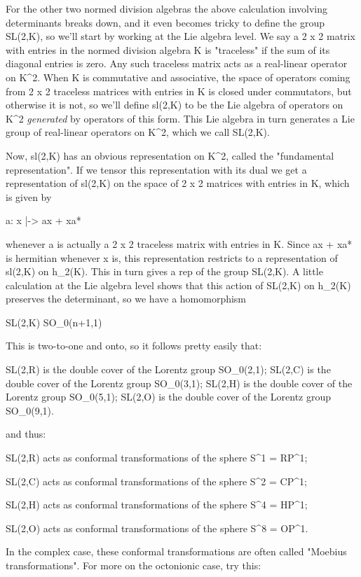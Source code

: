 For the other two normed division algebras the above calculation
involving determinants breaks down, and it even becomes tricky to define
the group SL(2,K), so we'll start by working at the Lie algebra level.
We say a 2 x 2 matrix with entries in the normed division algebra K is
"traceless" if the sum of its diagonal entries is zero.  Any
such traceless matrix acts as a real-linear operator on K^{2}.
When K is commutative and associative, the space of operators coming
from 2 x 2 traceless matrices with entries in K is closed under
commutators, but otherwise it is not, so we'll define sl(2,K) to be the
Lie algebra of operators on K^{2} \emph{generated} by
operators of this form.  This Lie algebra in turn generates a Lie group
of real-linear operators on K^{2}, which we call SL(2,K).

Now, sl(2,K) has an obvious representation on K^{2}, called the
"fundamental representation".  If we tensor this
representation with its dual we get a representation of sl(2,K) on the
space of 2 x 2 matrices with entries in K, which is given by

a: x |-> ax + xa*         

whenever a is actually a 2 x 2 traceless matrix with entries in K.
Since ax + xa* is hermitian whenever x is, this representation restricts
to a representation of sl(2,K) on h_{2}(K).  This in turn gives
a rep of the group SL(2,K).  A little calculation at the Lie algebra
level shows that this action of SL(2,K) on h_{2}(K) preserves
the determinant, so we have a homomorphism

SL(2,K) \to  SO_{0}(n+1,1)  

This is two-to-one and onto, so it follows pretty easily that:

SL(2,R) is the double cover of the Lorentz group SO_{0}(2,1);   
SL(2,C) is the double cover of the Lorentz group SO_{0}(3,1);  
SL(2,H) is the double cover of the Lorentz group SO_{0}(5,1); 
SL(2,O) is the double cover of the Lorentz group SO_{0}(9,1).

and thus:

SL(2,R) acts as conformal transformations of the sphere S^{1} = RP^{1};

SL(2,C) acts as conformal transformations of the sphere S^{2} = CP^{1};

SL(2,H) acts as conformal transformations of the sphere S^{4} = HP^{1};

SL(2,O) acts as conformal transformations of the sphere S^{8} = OP^{1}.

In the complex case, these conformal transformations are often
called "Moebius transformations".   For more on the octonionic
case, try this:

